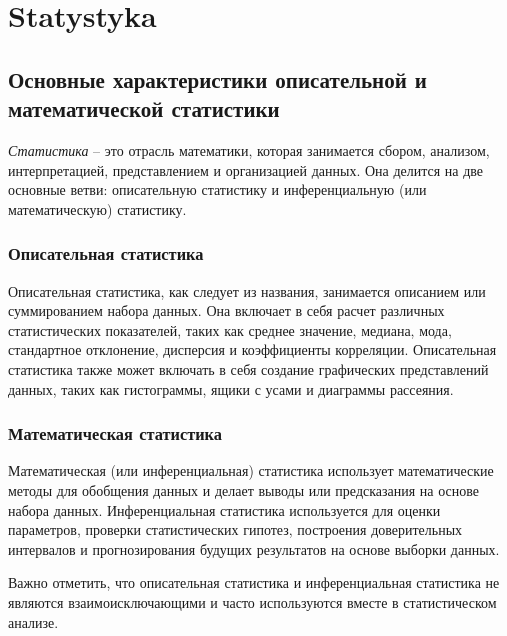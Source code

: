 \chapter{Statystyka}

\section{Основные характеристики описательной и математической статистики}

\textit{Статистика} – это отрасль математики, которая занимается сбором, анализом, интерпретацией, представлением и организацией данных. Она делится на две основные ветви: описательную статистику и инференциальную (или математическую) статистику.

\subsection{Описательная статистика}

Описательная статистика, как следует из названия, занимается описанием или суммированием набора данных. Она включает в себя расчет различных статистических показателей, таких как среднее значение, медиана, мода, стандартное отклонение, дисперсия и коэффициенты корреляции. Описательная статистика также может включать в себя создание графических представлений данных, таких как гистограммы, ящики с усами и диаграммы рассеяния.

\subsection{Математическая статистика}

Математическая (или инференциальная) статистика использует математические методы для обобщения данных и делает выводы или предсказания на основе набора данных. Инференциальная статистика используется для оценки параметров, проверки статистических гипотез, построения доверительных интервалов и прогнозирования будущих результатов на основе выборки данных.

Важно отметить, что описательная статистика и инференциальная статистика не являются взаимоисключающими и часто используются вместе в статистическом анализе.

